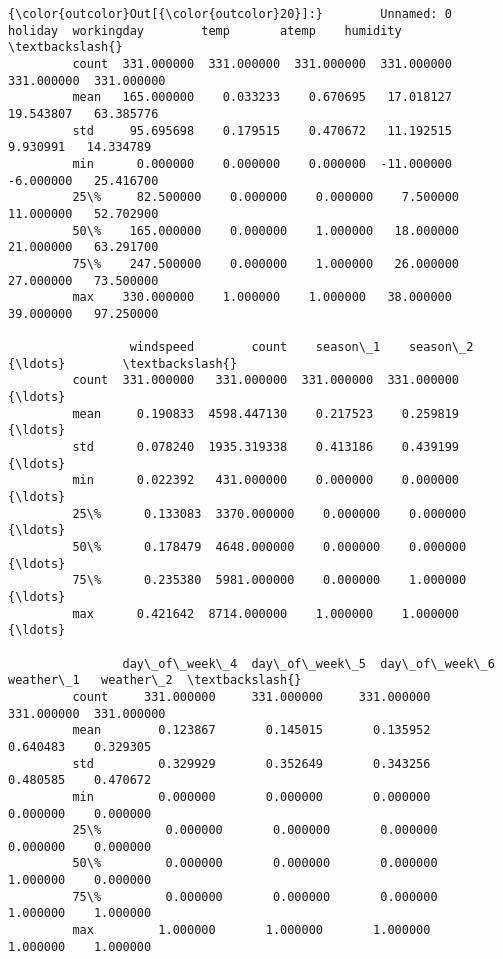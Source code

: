 \documentclass[11pt]{article}
\begin{document}
\begin{Verbatim}[commandchars=\\\{\}]
{\color{outcolor}Out[{\color{outcolor}20}]:}        Unnamed: 0     holiday  workingday        temp       atemp    humidity  \textbackslash{}
         count  331.000000  331.000000  331.000000  331.000000  331.000000  331.000000   
         mean   165.000000    0.033233    0.670695   17.018127   19.543807   63.385776   
         std     95.695698    0.179515    0.470672   11.192515    9.930991   14.334789   
         min      0.000000    0.000000    0.000000  -11.000000   -6.000000   25.416700   
         25\%     82.500000    0.000000    0.000000    7.500000   11.000000   52.702900   
         50\%    165.000000    0.000000    1.000000   18.000000   21.000000   63.291700   
         75\%    247.500000    0.000000    1.000000   26.000000   27.000000   73.500000   
         max    330.000000    1.000000    1.000000   38.000000   39.000000   97.250000   
         
                 windspeed        count    season\_1    season\_2       {\ldots}        \textbackslash{}
         count  331.000000   331.000000  331.000000  331.000000       {\ldots}         
         mean     0.190833  4598.447130    0.217523    0.259819       {\ldots}         
         std      0.078240  1935.319338    0.413186    0.439199       {\ldots}         
         min      0.022392   431.000000    0.000000    0.000000       {\ldots}         
         25\%      0.133083  3370.000000    0.000000    0.000000       {\ldots}         
         50\%      0.178479  4648.000000    0.000000    0.000000       {\ldots}         
         75\%      0.235380  5981.000000    0.000000    1.000000       {\ldots}         
         max      0.421642  8714.000000    1.000000    1.000000       {\ldots}         
         
                day\_of\_week\_4  day\_of\_week\_5  day\_of\_week\_6   weather\_1   weather\_2  \textbackslash{}
         count     331.000000     331.000000     331.000000  331.000000  331.000000   
         mean        0.123867       0.145015       0.135952    0.640483    0.329305   
         std         0.329929       0.352649       0.343256    0.480585    0.470672   
         min         0.000000       0.000000       0.000000    0.000000    0.000000   
         25\%         0.000000       0.000000       0.000000    0.000000    0.000000   
         50\%         0.000000       0.000000       0.000000    1.000000    0.000000   
         75\%         0.000000       0.000000       0.000000    1.000000    1.000000   
         max         1.000000       1.000000       1.000000    1.000000    1.000000   
         

\end{Verbatim}
\end{document}
